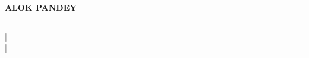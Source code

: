 \documentclass[margin, 10pt]{res} %
\begin{document}


\begin{center}
    {\LARGE \bfseries ALOK PANDEY} \\
    \rule{\textwidth}{1pt}
    \vspace{0.3em}
    \href{alokpandey.bitm@gmail.com} 
    \quad | \quad \\
    \href{https://github.com/its-ap0503}\quad | \quad \\
    \href{https://linkedin.com/in/alok-pandey-its-code-ape} \\
\end{center}



\end{document}
